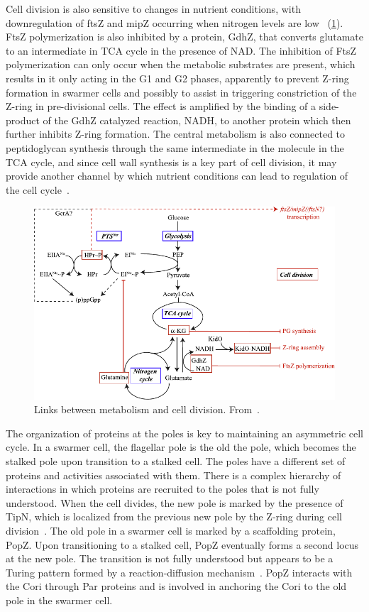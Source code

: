 Cell division is also sensitive to changes in nutrient conditions, with downregulation of ftsZ and mipZ occurring when nitrogen levels are low~\cite{collier2019} (\cref{fig:cell-division-metabolism}).
FtsZ polymerization is also inhibited by a protein, GdhZ, that converts glutamate to an intermediate in TCA cycle in the presence of NAD.
The inhibition of FtsZ polymerization can only occur when the metabolic substrates are present, which results in it only acting in the G1 and G2 phases, apparently to prevent Z-ring formation in swarmer cells and possibly to assist in triggering constriction of the Z-ring in pre-divisional cells.
The effect is amplified by the binding of a side-product of the GdhZ catalyzed reaction, NADH, to another protein which then further inhibits Z-ring formation.
The central metabolism is also connected to peptidoglycan synthesis through the same intermediate in the molecule in the TCA cycle, and since cell wall synthesis is a key part of cell division, it may provide another channel by which nutrient conditions can lead to regulation of the cell cycle~\cite{collier2019}.

\begin{figure}
    \centering
    \includegraphics{cell-division-metabolism}
    \caption{
        Links between metabolism and cell division.
        From~\cite{collier2019}.
        \label{fig:cell-division-metabolism}
     }
\end{figure}

The organization of proteins at the poles is key to maintaining an asymmetric cell cycle.
In a swarmer cell, the flagellar pole is the old the pole, which becomes the stalked pole upon transition to a stalked cell.
The poles have a different set of proteins and activities associated with them.
There is a complex hierarchy of interactions in which proteins are recruited to the poles that is not fully understood.
When the cell divides, the new pole is marked by the presence of TipN, which is localized from the previous new pole by the Z-ring during cell division~\cite{lasker2016}.
The old pole in a swarmer cell is marked by a scaffolding protein, PopZ.
Upon transitioning to a stalked cell, PopZ eventually forms a second locus at the new pole.
The transition is not fully understood but appears to be a Turing pattern formed by a reaction-diffusion mechanism~\cite{subramanian2017}.
PopZ interacts with the Cori through Par proteins and is involved in anchoring the Cori to the old pole in the swarmer cell.

